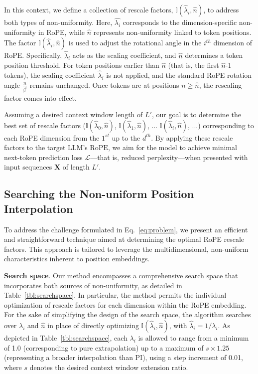 In this context, we define a collection of rescale factors, $\mathbb{I}(\hat{\lambda}_{i},\hat{n})$, to address both types of non-uniformity. Here, $\hat{\lambda_i}$ corresponds to the dimension-specific non-uniformity in RoPE, while $\hat{n}$ represents non-uniformity linked to token positions. The factor $\mathbb{I}(\hat{\lambda}_{i},\hat{n})$ is used to adjust the rotational angle in the $i^{th}$ dimension of RoPE. Specifically, $\hat\lambda_{i}$ acts as the scaling coefficient, and $\hat{n}$ determines a token position threshold. For token positions earlier than $\hat{n}$ (that is, the first $\hat{n}$-1 tokens), the scaling coefficient $\hat\lambda_{i}$ is not applied, and the standard RoPE rotation angle $\frac{n}{\beta^i}$ remains unchanged. Once tokens are at positions $n\ge\hat{n}$, the rescaling factor comes into effect.

Assuming a desired context window length of $L'$, our goal is to determine the best set of rescale factors ($\mathbb{I}(\hat{\lambda}_{0},\hat{n})$, $\mathbb{I}(\hat{\lambda}_{1},\hat{n})$, ... $\mathbb{I}(\hat{\lambda}_{i},\hat{n})$, ...) corresponding to each RoPE dimension from the $1^{st}$ up to the $d^{th}$. By applying these rescale factors to the target $\text{LLM}$'s $\text{RoPE}$, we aim for the model to achieve minimal next-token prediction loss $\mathcal{L}$—that is, reduced perplexity—when presented with input sequences $\mathbf{X}$ of length $L'$.

\subsection{Searching the Non-uniform Position Interpolation}

To address the challenge formulated in Eq.~\ref{eq:problem}, we present an efficient and straightforward technique aimed at determining the optimal RoPE rescale factors. This approach is tailored to leverage the multidimensional, non-uniform characteristics inherent to position embeddings.

\textbf{Search space}. Our method encompasses a comprehensive search space that incorporates both sources of non-uniformity, as detailed in Table~\ref{tbl:searchspace}. In particular, the method permits the individual optimization of rescale factors for each dimension within the RoPE embedding. For the sake of simplifying the design of the search space, the algorithm searches over $\lambda_i$ and $\hat{n}$ in place of directly optimizing $\mathbb{I}(\hat{\lambda}_{i},\hat{n})$, with $\hat{\lambda}_{i}=1/\lambda_i$. As depicted in Table~\ref{tbl:searchspace}, each $\lambda_i$ is allowed to range from a minimum of 1.0 (corresponding to pure extrapolation) up to a maximum of $s\times1.25$ (representing a broader interpolation than PI), using a step increment of 0.01, where $s$ denotes the desired context window extension ratio.


